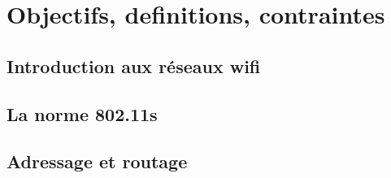 \chapter{Objectifs, definitions, contraintes}
\section{Introduction aux réseaux wifi}
\section{La norme 802.11s}
\section{Adressage et routage}